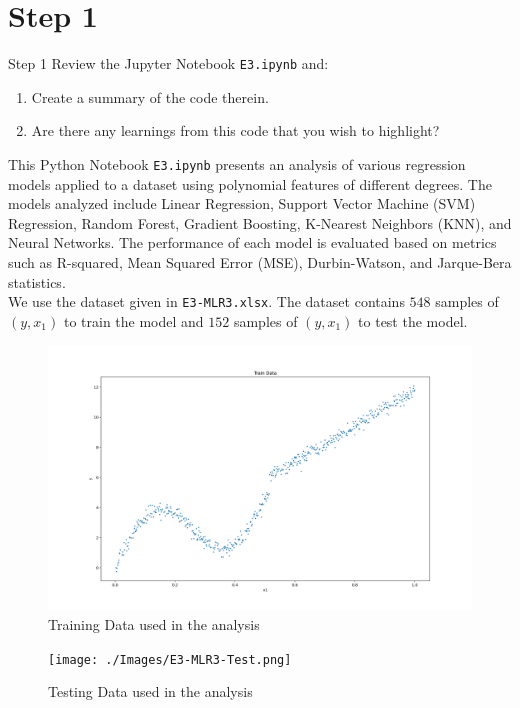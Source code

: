 \section*{Step 1}

\begin{custombox}[label={box:Q1}]{Step 1}
	Review the Jupyter Notebook \verb|E3.ipynb| and:
	\begin{enumerate}[label=(\alph*)]
		\item Create a summary of the code therein.
		\item Are there any learnings from this code that you wish to highlight?
	\end{enumerate}
\end{custombox}

\vspace{5mm}

This Python Notebook \verb|E3.ipynb| presents an analysis of various regression models applied to a dataset using polynomial features of different degrees. The models analyzed include Linear Regression, Support Vector Machine (SVM) Regression, Random Forest, Gradient Boosting, K-Nearest Neighbors (KNN), and Neural Networks. The performance of each model is evaluated based on metrics such as R-squared, Mean Squared Error (MSE), Durbin-Watson, and Jarque-Bera statistics. \\

We use the dataset given in \verb|E3-MLR3.xlsx|. The dataset contains $548$ samples of $(y, x_1)$ to train the model and $152$ samples of $(y, x_1)$ to test the model. 

\begin{figure}[H]
	\centering
	\includegraphics[width=0.7\linewidth]{./Images/E3-MLR3-Train.png}
	\caption{Training Data used in the analysis}
\end{figure}

\begin{figure}[H]
	\centering
	\texttt{[image: ./Images/E3-MLR3-Test.png]}
	\caption{Testing Data used in the analysis}
\end{figure}


\clearpage